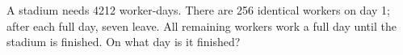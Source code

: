 A stadium needs 4212 worker-days. There are 256 identical workers on day 1; after each full day, seven leave. All remaining workers work a full day until the stadium is finished. On what day is it finished?
